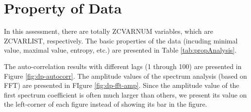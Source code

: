 \section{Property of Data}

In this assessment, there are totally ZCVARNUM variables, which are ZCVARLIST, respectively. 
The basic properties of the data (incuding minimal value, maximal value, entropy, etc.) are presented in Table \ref{tab:propAnalysis}. 


The auto-correlation results with different lags (1 through 100) are presented in Figure \ref{fig:dp-autocorr}.
The amplitude values of the spectrum analysis (based on FFT) are presented in FIgure \ref{fig:dp-fft-amp}. Since the amplitude value of the first spectrum coefficient is often much larger than others, we present its value on the left-corner of each figure instead of showing its bar in the figure. 

